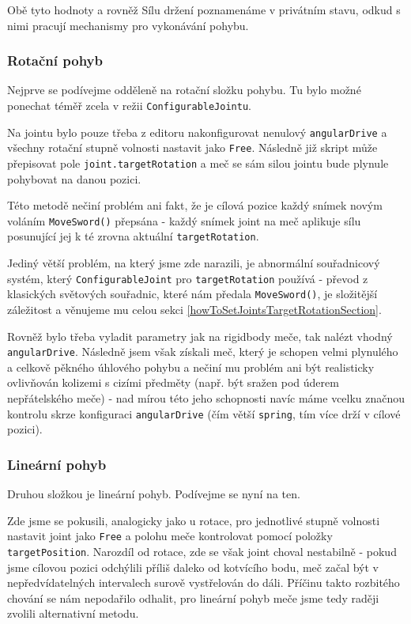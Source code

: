 Obě tyto hodnoty a rovněž Sílu držení poznamenáme v privátním stavu, odkud s nimi pracují mechanismy pro vykonávání pohybu.

\subsubsection*{Rotační pohyb} \label{implementationSwordAngularMovementSubsubsection}

Nejprve se podívejme odděleně na rotační složku pohybu. Tu bylo možné ponechat téměř zcela v režii \texttt{ConfigurableJointu}.

Na jointu bylo pouze třeba z editoru nakonfigurovat nenulový \texttt{angularDrive} a všechny rotační stupně volnosti nastavit jako \texttt{Free}. Následně již skript může přepisovat pole \texttt{joint.targetRotation} a meč se sám silou jointu bude plynule pohybovat na danou pozici.

Této metodě nečiní problém ani fakt, že je cílová pozice každý snímek novým voláním \texttt{MoveSword()} přepsána - každý snímek joint na meč aplikuje sílu posunující jej k té zrovna aktuální \texttt{targetRotation}. 

Jediný větší problém, na který jsme zde narazili, je abnormální souřadnicový systém, který \texttt{ConfigurableJoint} pro \texttt{targetRotation} používá - převod z klasických světových souřadnic, které nám předala \texttt{MoveSword()}, je složitější záležitost a věnujeme mu celou sekci \ref{howToSetJointsTargetRotationSection}. 

Rovněž bylo třeba vyladit parametry jak na rigidbody meče, tak nalézt vhodný \texttt{angularDrive}. Následně jsem však získali meč, který je schopen velmi plynulého a celkově pěkného úhlového pohybu a nečiní mu problém ani být realisticky ovlivňován kolizemi s cizími předměty (např. být sražen pod úderem nepřátelského meče) - nad mírou této jeho schopnosti navíc máme vcelku značnou kontrolu skrze konfiguraci \texttt{angularDrive} (čím větší \texttt{spring}, tím více drží v cílové pozici).

\subsubsection*{Lineární pohyb}

Druhou složkou je lineární pohyb. Podívejme se nyní na ten.

Zde jsme se pokusili, analogicky jako u rotace, pro jednotlivé stupně volnosti nastavit joint jako \texttt{Free} a polohu meče kontrolovat pomocí položky \texttt{targetPosition}. Narozdíl od rotace, zde se však joint choval nestabilně - pokud jsme cílovou pozici odchýlili příliš daleko od kotvícího bodu, meč začal být v nepředvídatelných intervalech surově vystřelován do dáli. Příčinu takto rozbitého chování se nám nepodařilo odhalit, pro lineární pohyb meče jsme tedy raději zvolili alternativní metodu. 

